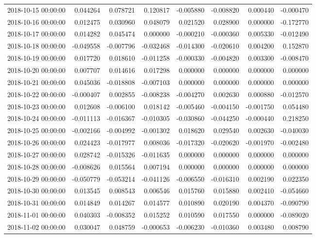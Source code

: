 \begin{tabular}{lrrrrrrr}
2018-10-15 00:00:00 & 0.044264 & 0.078721 & 0.120817 & -0.005880 & -0.008820 & 0.000440 & -0.000470 \\
2018-10-16 00:00:00 & 0.012475 & 0.030960 & 0.048079 & 0.021520 & 0.028900 & 0.000000 & -0.172770 \\
2018-10-17 00:00:00 & 0.014282 & 0.045474 & 0.000000 & -0.000210 & -0.000360 & 0.005330 & -0.012490 \\
2018-10-18 00:00:00 & -0.049558 & -0.007796 & -0.032468 & -0.014300 & -0.020610 & 0.004200 & 0.152870 \\
2018-10-19 00:00:00 & 0.017720 & 0.018610 & -0.011258 & -0.000330 & -0.004820 & 0.003300 & -0.008470 \\
2018-10-20 00:00:00 & 0.007707 & 0.014616 & 0.017298 & 0.000000 & 0.000000 & 0.000000 & 0.000000 \\
2018-10-21 00:00:00 & 0.045036 & -0.018808 & -0.007103 & 0.000000 & 0.000000 & 0.000000 & 0.000000 \\
2018-10-22 00:00:00 & -0.000407 & 0.002855 & -0.008238 & -0.004270 & 0.002630 & 0.000880 & -0.012570 \\
2018-10-23 00:00:00 & 0.012608 & -0.006100 & 0.018142 & -0.005460 & -0.004150 & -0.001750 & 0.054480 \\
2018-10-24 00:00:00 & -0.011113 & -0.016367 & -0.010305 & -0.030860 & -0.044250 & -0.000440 & 0.218250 \\
2018-10-25 00:00:00 & -0.002166 & -0.004992 & -0.001302 & 0.018620 & 0.029540 & 0.002630 & -0.040030 \\
2018-10-26 00:00:00 & 0.024423 & -0.017977 & 0.008036 & -0.017320 & -0.020620 & -0.001970 & -0.002480 \\
2018-10-27 00:00:00 & 0.028742 & -0.015326 & -0.011635 & 0.000000 & 0.000000 & 0.000000 & 0.000000 \\
2018-10-28 00:00:00 & -0.008626 & 0.015564 & 0.007194 & 0.000000 & 0.000000 & 0.000000 & 0.000000 \\
2018-10-29 00:00:00 & -0.050779 & -0.053214 & -0.041126 & -0.006550 & -0.016310 & 0.002190 & 0.022350 \\
2018-10-30 00:00:00 & 0.013545 & 0.008543 & 0.006546 & 0.015760 & 0.015880 & 0.002410 & -0.054660 \\
2018-10-31 00:00:00 & 0.014849 & 0.014267 & 0.014577 & 0.010890 & 0.020190 & 0.004370 & -0.090790 \\
2018-11-01 00:00:00 & 0.040303 & -0.008352 & 0.015252 & 0.010590 & 0.017550 & 0.000000 & -0.089020 \\
2018-11-02 00:00:00 & 0.030047 & 0.048759 & -0.000653 & -0.006230 & -0.010360 & 0.003480 & 0.008790 \\

\end{tabular}
